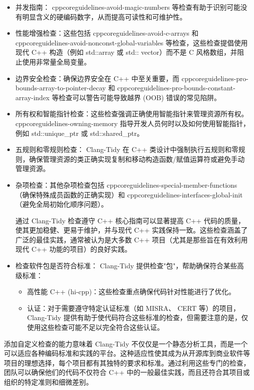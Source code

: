 \begin{itemize}
\item
并发指南： cppcoreguidelines-avoid-magic-numbers 等检查有助于识别可能没有明显含义的硬编码数字，从而提高可读性和可维护性。

\item
性能增强检查：这些包括 cppcoreguidelines-avoid-c-arrays 和 cppcoreguidelines-avoid-nonconst-global-variables 等检查，这些检查提倡使用现代 C++ 构造（例如 std::array 或 std:: vector）而不是 C 风格数组，并阻止使用非常量全局变量。

\item
边界安全检查：确保边界安全在 C++ 中至关重要，而 cppcoreguidelines-pro-bounds-array-to-pointer-decay 和 cppcoreguidelines-pro-bounds-constant-array-index 等检查可以警告可能导致越界 (OOB) 错误的常见陷阱。

\item
所有权和智能指针检查：这些检查强调正确使用智能指针来管理资源所有权。 cppcoreguidelines-owning-memory 指导开发人员何时以及如何使用智能指针，例如 std::unique\_ptr 或 std::shared\_ptr。

\item
五规则和零规则检查： Clang-Tidy 在 C++ 类设计中强制执行五规则和零规则，确保管理资源的类正确实现复制和移动构造函数/赋值运算符或避免手动管理资源。

\item
杂项检查：其他杂项检查包括 cppcoreguidelines-special-member-functions（确保特殊成员函数的正确实现）和 cppcoreguidelines-interfaces-global-init（避免全局初始化顺序问题）。

通过 Clang-Tidy 检查遵守 C++ 核心指南可以显著提高 C++ 代码的质量，使其更加稳健、更易于维护，并与现代 C++ 实践保持一致。这些检查涵盖了广泛的最佳实践，通常被认为是大多数 C++ 项目（尤其是那些旨在有效利用现代 C++ 功能的项目）的良好实践。

\item
检查软件包是否符合标准： Clang-Tidy 提供检查"包"，帮助确保符合某些高级标准：

\begin{itemize}
\item
高性能 C++ (hi-cpp)：这些检查重点确保代码针对性能进行了优化。

\item
认证：对于需要遵守特定认证标准（如 MISRA、 CERT 等）的项目， Clang-Tidy 提供有助于使代码符合这些标准的检查，但需要注意的是，仅使用这些检查可能不足以完全符合这些认证。
\end{itemize}
\end{itemize}

添加自定义检查的能力意味着 Clang-Tidy 不仅仅是一个静态分析工具，而是一个可以适应各种编码标准和实践的平台。这种适应性使其成为从开源库到商业软件等项目的理想选择，每个项目都有其独特的要求和标准。通过利用这些专门的检查，团队可以确保他们的代码不仅符合 C++ 中的一般最佳实践，而且还符合其项目或组织的特定准则和细微差别。

